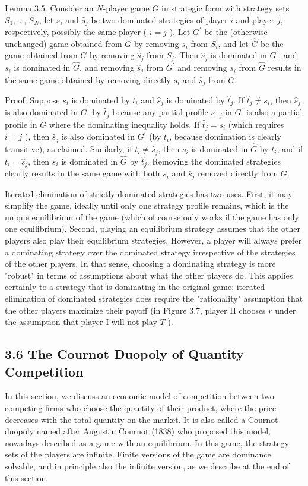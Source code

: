 \documentclass[12pt]{article}
\begin{document}
Lemma 3.5. Consider an $N$-player game $G$ in strategic form with strategy sets $S_{1}, \ldots$, $S_{N}$, let $s_{i}$ and $\hat{s}_{j}$ be two dominated strategies of player $i$ and player $j$, respectively, possibly the same player ( $i=j$ ). Let $G^{\prime}$ be the (otherwise unchanged) game obtained from $G$ by removing $s_{i}$ from $S_{i}$, and let $\hat{G}$ be the game obtained from $G$ by removing $\hat{s}_{j}$ from $S_{j}$. Then $\hat{s}_{j}$ is dominated in $G^{\prime}$, and $s_{i}$ is dominated in $\hat{G}$, and removing $\hat{s}_{j}$ from $G^{\prime}$ and removing $s_{i}$ from $\hat{G}$ results in the same game obtained by removing directly $s_{i}$ and $\hat{s}_{j}$ from $G$.

Proof. Suppose $s_{i}$ is dominated by $t_{i}$ and $\hat{s}_{j}$ is dominated by $\hat{t}_{j}$. If $\hat{t}_{j} \neq s_{i}$, then $\hat{s}_{j}$ is also dominated in $G^{\prime}$ by $\hat{t}_{j}$ because any partial profile $s_{-j}$ in $G^{\prime}$ is also a partial\\
profile in $G$ where the dominating inequality holds. If $\hat{t}_{j}=s_{i}$ (which requires $i=j$ ), then $\hat{s}_{j}$ is also dominated in $G^{\prime}$ (by $t_{i}$, because domination is clearly transitive), as claimed. Similarly, if $t_{i} \neq \hat{s}_{j}$, then $s_{i}$ is dominated in $\hat{G}$ by $t_{i}$, and if $t_{i}=\hat{s}_{j}$, then $s_{i}$ is dominated in $\hat{G}$ by $\hat{t}_{j}$. Removing the dominated strategies clearly results in the same game with both $s_{i}$ and $\hat{s}_{j}$ removed directly from $G$.

Iterated elimination of strictly dominated strategies has two uses. First, it may simplify the game, ideally until only one strategy profile remains, which is the unique equilibrium of the game (which of course only works if the game has only one equilibrium). Second, playing an equilibrium strategy assumes that the other players also play their equilibrium strategies. However, a player will always prefer a dominating strategy over the dominated strategy irrespective of the strategies of the other players. In that sense, choosing a dominating strategy is more "robust" in terms of assumptions about what the other players do. This applies certainly to a strategy that is dominating in the original game; iterated elimination of dominated strategies does require the "rationality" assumption that the other players maximize their payoff (in Figure 3.7, player II chooses $r$ under the assumption that player I will not play $T$ ).

\subsection*{3.6 The Cournot Duopoly of Quantity Competition}
In this section, we discuss an economic model of competition between two competing firms who choose the quantity of their product, where the price decreases with the total quantity on the market. It is also called a Cournot duopoly named after Augustin Cournot (1838) who proposed this model, nowadays described as a game with an equilibrium. In this game, the strategy sets of the players are infinite. Finite versions of the game are dominance solvable, and in principle also the infinite version, as we describe at the end of this section.
\end{document}

